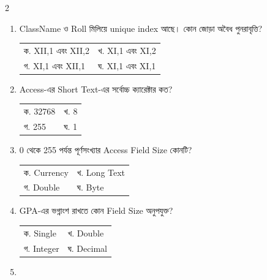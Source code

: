 \begin{multicols}{2}
\begin{enumerate}[resume]
\begin{minipage}[t]{\linewidth}
\begin{tabularx}{\linewidth}{@{}X X@{}}
\end{tabularx}
\end{minipage}
\vspace{1pt}
\item \begin{minipage}[t]{\linewidth}
ClassName ও Roll মিলিয়ে unique index আছে। কোন জোড়া অবৈধ পুনরাবৃত্তি?
\par
\begin{tabularx}{\linewidth}{@{}X X@{}}
ক. XII,1 এবং XII,2 & খ. XI,1 এবং XI,2 \\
গ. XI,1 এবং XII,1 & ঘ. XI,1 এবং XI,1 \\
\end{tabularx}
\end{minipage}
\vspace{1pt}
\item \begin{minipage}[t]{\linewidth}
Access-এর Short Text-এর সর্বোচ্চ ক্যারেক্টার কত?
\par
\begin{tabularx}{\linewidth}{@{}X X@{}}
ক. 32768 & খ. 8 \\
গ. 255 & ঘ. 1 \\
\end{tabularx}
\end{minipage}
\vspace{1pt}
\item \begin{minipage}[t]{\linewidth}
0 থেকে 255 পর্যন্ত পূর্ণসংখ্যার Access Field Size কোনটি?
\par
\begin{tabularx}{\linewidth}{@{}X X@{}}
ক. Currency & খ. Long Text \\
গ. Double & ঘ. Byte \\
\end{tabularx}
\end{minipage}
\vspace{1pt}
\item \begin{minipage}[t]{\linewidth}
GPA-এর ভগ্নাংশ রাখতে কোন Field Size অনুপযুক্ত?
\par
\begin{tabularx}{\linewidth}{@{}X X@{}}
ক. Single & খ. Double \\
গ. Integer & ঘ. Decimal \\
\end{tabularx}
\end{minipage}
\vspace{1pt}
\item \begin{minipage}[t]{\linewidth}

\end{minipage}
\end{enumerate}
\end{multicols}
